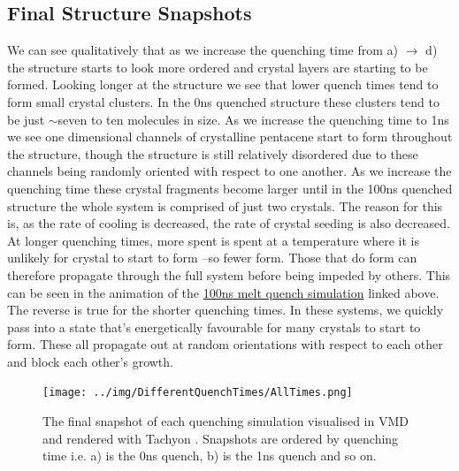 \subsection{Final Structure Snapshots}
\noindent We can see qualitatively that as we increase the quenching time from a) $\rightarrow$ d) the structure starts to look more ordered and crystal layers are starting to be formed. Looking longer at the structure we see that lower quench times tend to form small crystal clusters. In the 0ns quenched structure these clusters tend to be just $\sim$seven to ten molecules in size. As we increase the quenching time to 1ns we see one dimensional channels of crystalline pentacene start to form throughout the structure, though the structure is still relatively disordered due to these channels being randomly oriented with respect to one another. As we increase the quenching time these crystal fragments become larger until in the 100ns quenched structure the whole system is comprised of just two crystals. The reason for this is, as the rate of cooling is decreased, the rate of crystal seeding is also decreased. At longer quenching times, more spent is spent at a temperature where it is unlikely for crystal to start to form --so fewer form. Those that do form can therefore propagate through the full system before being impeded by others. This can be seen in the animation of the \href{https://youtu.be/6IQcYErQHVs}{100ns melt quench simulation} linked above. The reverse is true for the shorter quenching times. In these systems, we quickly pass into a state that's energetically favourable for many crystals to start to form. These all propagate out at random orientations with respect to each other and block each other's growth.

\begin{figure}[ht]
	\texttt{[image: ../img/DifferentQuenchTimes/AllTimes.png]}
	\caption{\label{fig:final_snapshots}The final snapshot of each quenching simulation visualised in VMD \cite{VMD} and rendered with Tachyon \cite{Tachyon}. Snapshots are ordered by quenching time i.e. a) is the 0ns quench, b) is the 1ns quench and so on.}
\end{figure}
